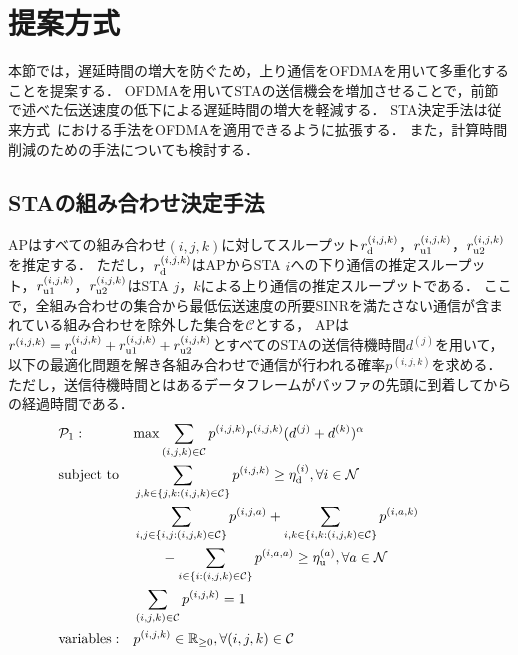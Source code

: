 \documentclass[technicalreport]{ieicej}
\newcommand{\sij}{(i,j)}
\newcommand{\sijk}{(i,j,k)}
\newcommand{\rijk}{r^{(i,j,k)}}
\newcommand{\mthc}{\mathcal C}
\def\coloneqq{\mathrel{\mathop:}=}
\begin{document}
\section{提案方式}\label{sec:propose}
	本節では，遅延時間の増大を防ぐため，上り通信をOFDMAを用いて多重化することを提案する．
	OFDMAを用いてSTAの送信機会を増加させることで，前節で述べた伝送速度の低下による遅延時間の増大を軽減する．
	STA決定手法は従来方式~\cite{promac_fair}における手法をOFDMAを適用できるように拡張する．
	また，計算時間削減のための手法についても検討する．
	\subsection{STAの組み合わせ決定手法}\label{sec:opt}
		APはすべての組み合わせ$(i,j,k)$に対してスループット$r^{(i,j,k)}_{\rm d}$，$r^{(i,j,k)}_{\rm u1}$，$r^{(i,j,k)}_{\rm u2}$を推定する．
		ただし，$r^{(i,j,k)}_{\rm d}$はAPからSTA $i$への下り通信の推定スループット，$r^{(i,j,k)}_{\rm u1}$，$r^{(i,j,k)}_{\rm u2}$はSTA $j$，$k$による上り通信の推定スループットである．
		ここで，全組み合わせの集合から最低伝送速度の所要SINRを満たさない通信が含まれている組み合わせを除外した集合を$\mthc$とする，
		APは$\rijk=r^{(i,j,k)}_{\rm d}+r^{(i,j,k)}_{\rm u1}+r^{(i,j,k)}_{\rm u2}$とすべてのSTAの送信待機時間$d^{(j)}$を用いて，以下の最適化問題を解き各組み合わせで通信が行われる確率$p^{(i,j,k)}$を求める．
		ただし，送信待機時間とはあるデータフレームがバッファの先頭に到着してからの経過時間である．
		\begin{align}
			&{\mathcal P}_1: && {\rm max} \sum_{(i,j,k)\in{\mathcal C}} p^{(i,j,k)}r^{(i,j,k)}(d^{(j)}+d^{(k)})^{\alpha} &&&&&&\\
			&{\rm subject\ to} && \sum_{j,k\in\{j,k:(i,j,k)\in{\mathcal C}\}} p^{(i,j,k)} \geq \eta_{\rm d}^{(i)}, \forall i\in {\mathcal N}  \\
			&&& \sum_{i,j\in\{i,j:(i,j,k)\in{\mathcal C}\}} p^{(i,j,a)} +\sum_{i,k\in\{i,k:(i,j,k)\in{\mathcal C}\}} p^{(i,a,k)} \nonumber\\&&&\qquad- \sum_{i\in\{i:(i,j,k)\in{\mathcal C}\}} p^{(i,a,a)} \geq \eta_{\rm u}^{(a)}, \forall a\in {\mathcal N}  \\
			&&& \sum_{(i,j,k)\in{\mathcal C}} p^{(i,j,k)}=1 \\
			&{\rm variables:} &&p^{(i,j,k)} \in {\mathbb R}_{\geq 0},\forall(i,j,k)\in {\mathcal C}
		\end{align}
\end{document}
